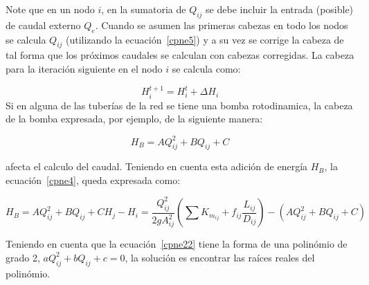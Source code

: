 \documentclass[11pt, oneside]{article}
\begin{document}
Note que en un nodo $i$, en la sumatoria de $Q_{ij}$ se debe incluir la entrada (posible) de caudal externo $Q_{e}$. Cuando se asumen las primeras cabezas en todo los nodos se calcula $Q_{ij}$ (utilizando la ecuaci\'on~\ref{cpne5}) y a su vez se corrige  la cabeza de tal forma que los pr\'oximos caudales se calculan con cabezas corregidas. La cabeza para la iteraci\'on siguiente en el nodo $i$ se calcula como:

\begin{equation}
H_i^{t+1} = H_i^{t}+\Delta H_i
\label{cpne20}
\end{equation}
Si en alguna de las tuber\'ias de la red se tiene una bomba rotodinamica, la cabeza de la bomba expresada, por ejemplo, de la siguiente manera:

\begin{equation}
H_B = AQ_{ij}^2 + BQ_{ij} + C
\label{cpne21}
\end{equation}

afecta el calculo del caudal. Teniendo en cuenta esta adici\'on de energ\'ia $H_B$, la ecuaci\'on~\ref{cpne4}, queda expresada como:

\begin{equation}
H_B = AQ_{ij}^2 + BQ_{ij} + C
H_j - H_i = \frac{Q_{ij}^2}{2gA_{ij}^2}\left( \sum K_{m_{ij}}  + f_{ij}\frac{L_{ij}}{D_{ij}} \right) - (AQ_{ij}^2 + BQ_{ij} + C)
\label{cpne22}
\end{equation}

Teniendo en cuenta que la ecuaci\'on~\ref{cpne22} tiene la forma de una polin\'omio de grado 2, $aQ_{ij}^2 + bQ_{ij} + c = 0$,  la soluci\'on es encontrar las ra\'ices reales del polin\'omio.
\end{document}
